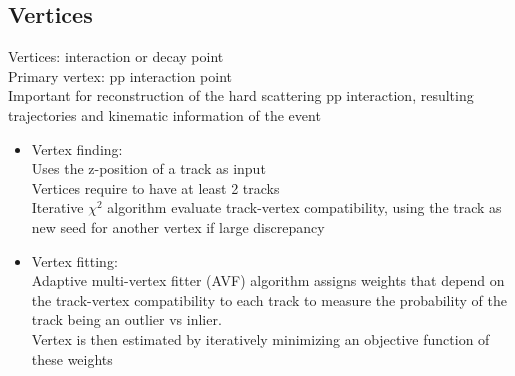 \documentclass[../thesis.tex]{subfiles}
\begin{document}
\subsection{Vertices}
Vertices: interaction or decay point\\
Primary vertex: pp interaction point\\
Important for reconstruction of the hard scattering pp interaction, resulting trajectories and kinematic information of the event\\
\begin{itemize}
\item Vertex finding:\\
Uses the z-position of a track as input\\
Vertices require to have at least 2 tracks\\
Iterative $\chi^2$ algorithm evaluate track-vertex compatibility, using the track as new seed for another vertex if large discrepancy
\item Vertex fitting:\\
Adaptive multi-vertex fitter (AVF) algorithm assigns weights that depend on the track-vertex compatibility to each track to measure the probability of the track being an outlier vs inlier.\\
Vertex is then estimated by iteratively minimizing an objective function of these weights
\end{itemize}
\end{document}
